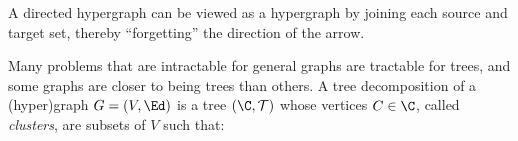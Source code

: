 A directed hypergraph 
can be viewed as a hypergraph
by joining
each source and target set,
thereby ``forgetting'' the direction of the arrow.

Many problems that are intractable for general graphs
are tractable for trees, and
some graphs are closer to being trees than others.
%
A tree decomposition of a (hyper)graph $G = (V, \Ed)$ is a tree $(\C, \mathcal T)$ whose vertices $C \in \C$, called
\emph{clusters}, are subsets of $V$ such that:

